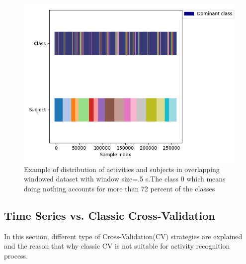 \begin{figure}[h]
    \centering
    \includegraphics[width=.4\textwidth]{Figures/Class_subject.png}
    \caption{Example of distribution of activities and subjects in overlapping windowed dataset with window size=.5 s.The class 0 which means doing nothing accounts for more than 72 percent of the classes   }
    \label{fig:class}
\end{figure}

\subsection{Time Series  vs. Classic Cross-Validation}
In this section, different type of Cross-Validation(CV) strategies are explained and the reason that why classic CV is not suitable for activity recognition process.\newline

